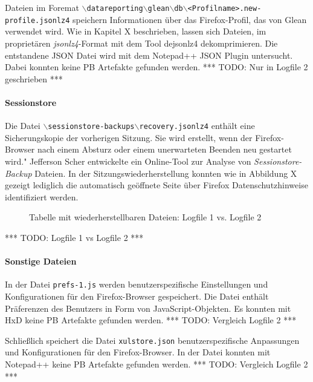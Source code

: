 \begin{appendices}
Dateien im Foremat \texttt{$\backslash$datareporting$\backslash$glean$\backslash$db$\backslash$<Profilname>.new-profile.jsonlz4} speichern Informationen über das Firefox-Profil, das von Glean verwendet wird. Wie in Kapitel X beschrieben, lassen sich Dateien, im proprietären \textit{jsonlz4}-Format mit dem Tool dejsonlz4 dekomprimieren. Die entstandene JSON Datei wird mit dem Notepad++ JSON Plugin untersucht. Dabei konnten keine PB Artefakte gefunden werden.
*** TODO: Nur in Logfile 2 geschrieben ***

\paragraph*{Sessionstore}
Die Datei \texttt{$\backslash$sessionstore-backups$\backslash$recovery.jsonlz4} enthält eine Sicherungskopie der vorherigen Sitzung. Sie wird erstellt, wenn der Firefox-Browser nach einem Absturz oder einem unerwarteten Beenden neu gestartet wird." %
Jefferson Scher entwickelte ein Online-Tool zur Analyse von \textit{Sessionstore-Backup} Dateien.
In der Sitzungswiederherstellung konnten wie in Abbildung X gezeigt lediglich die automatisch geöffnete Seite über Firefox Datenschutzhinweise identifiziert werden.
\begin{figure}[h!]
	\caption{Tabelle mit wiederherstellbaren Dateien: Logfile 1 vs. Logfile 2}
\end{figure}
*** TODO: Logfile 1 vs Logfile 2 ***

\paragraph*{Sonstige Dateien}
In der Datei \texttt{prefs-1.js} werden benutzerspezifische Einstellungen und Konfigurationen für den Firefox-Browser gespeichert. Die Datei enthält Präferenzen des Benutzers in Form von JavaScript-Objekten. Es konnten mit HxD keine PB Artefakte gefunden werden.
*** TODO: Vergleich Logfile 2 ***

Schließlich speichert die Datei \texttt{xulstore.json} benutzerspezifische Anpassungen und Konfigurationen für den Firefox-Browser. In der Datei konnten mit Notepad++ keine PB Artefakte gefunden werden.
*** TODO: Vergleich Logfile 2 ***	

\end{appendices}
